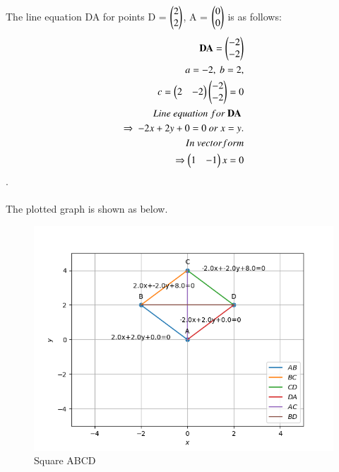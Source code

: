 \documentclass[journal,12pt,twocolumn]{IEEEtran}
\begin{document}
\\
\\
The line equation DA for points D = $\begin{pmatrix}2\\2\end{pmatrix}$, A = $\begin{pmatrix}0\\0\end{pmatrix}$ is as follows:\\
\begin{align}
\begin{split}
\mathbf{DA} = \begin{pmatrix}-2\\-2\end{pmatrix}\\
a=-2,\ b=2,\\
c=\begin{pmatrix}2 & -2\end{pmatrix} \begin{pmatrix}-2\\-2\end{pmatrix}=0\\
Line\ equation\ for\ \mathbf{DA}\ \\ \Rightarrow\ -2x+2y+0=0 \ or \ x=y. \\
In\ vector form\\
\Rightarrow \begin{pmatrix}1&-1\end{pmatrix}x=0
\end{split}
\end{align}.
\\
\\
The plotted graph is shown as below.
\begin{figure}[!ht]
    \centering
    \includegraphics[width=\columnwidth]{assignment2_shiftingvertices.png}
    \caption{Square ABCD}
    \label{fig:Square ABCD}
\end{figure}
\end{document}
